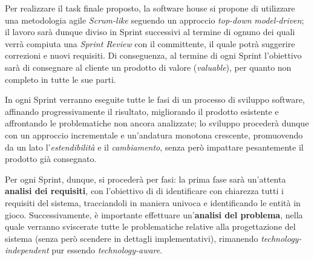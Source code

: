

Per realizzare il task finale proposto, la software house si propone di utilizzare una metodologia agile \textit{Scrum-like}
seguendo un approccio \textit{top-down} \textit{model-driven};
il lavoro sarà dunque diviso in Sprint successivi al termine di ognuno dei quali verrà compiuta una \textit{Sprint Review}
con il committente, il quale potrà suggerire correzioni e nuovi requisiti.
Di conseguenza, al termine di ogni Sprint l'obiettivo sarà di consegnare al cliente un prodotto di valore (\textit{valuable}),
per quanto non completo in tutte le sue parti.

In ogni Sprint verranno eseguite tutte le fasi di un processo di sviluppo software, affinando progressivamente il risultato,
migliorando il prodotto esistente e affrontando le problematiche non ancora analizzate;
lo sviluppo procederà dunque con un approccio incrementale e un'andatura monotona crescente, promuovendo da un lato
l'\textit{estendibilità} e il \textit{cambiamento}, senza però impattare pesantemente il prodotto già consegnato.

Per ogni Sprint, dunque, si procederà per fasi:
la prima fase sarà un'attenta \textbf{analisi dei requisiti}, con l'obiettivo di di identificare con chiarezza
tutti i requisiti del sistema, tracciandoli in maniera univoca e identificando le entità in gioco.
Successivamente, è importante effettuare un'\textbf{analisi del problema}, nella quale verranno sviscerate tutte le problematiche
relative alla progettazione del sistema (senza però scendere in dettagli implementativi),
rimanendo \textit{technology-independent} pur essendo \textit{technology-aware}.
